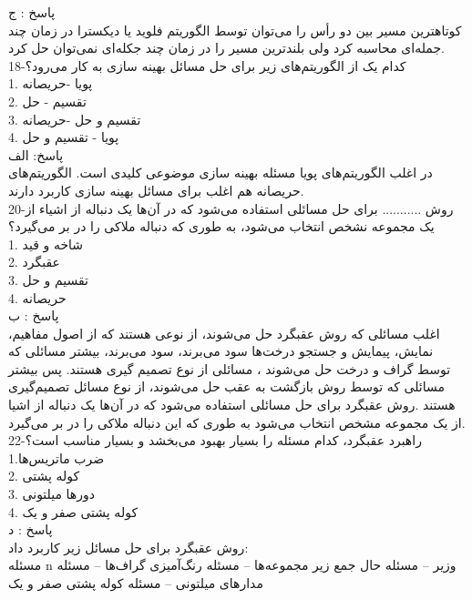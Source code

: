 \documentclass[10pt,a4paper]{article}
\begin{document}
پاسخ : ج\\
کوتاهترین مسیر بین دو رأس را می‌توان توسط الگوریتم فلوید یا دیکسترا در زمان چند جمله‌ای محاسبه کرد ولی بلندترین مسیر را در زمان چند جکله‌ای نمی‌توان حل کرد.\\

18-کدام یک از الگوریتم‌های زیر برای حل مسائل بهینه سازی به کار می‌رود؟\\
1. پویا -حریصانه\\
2. تقسیم - حل\\
3. تقسیم و حل -حریصانه\\
4. پویا - تقسیم و حل\\

پاسخ: الف\\
در اغلب الگوریتم‌های پویا مسئله بهینه سازی موضوعی کلیدی است. الگوریتم‌های حریصانه هم اغلب برای مسائل بهینه سازی کاربرد دارند.\\

20-روش ........... برای حل مسائلی استفاده می‌شود که در آن‌ها یک دنباله از اشیاء از یک مجموعه نشخص انتخاب می‌شود، به طوری که دنباله ملاکی را در بر می‌گیرد؟\\
1. شاخه و قید\\
2. عقبگرد \\
3. تقسیم و حل\\
4. حریصانه\\

پاسخ : ب\\
اغلب مسائلی که روش عقبگرد حل می‌شوند، از نوعی هستند که از اصول مفاهیم، نمایش، پیمایش و جستجو درخت‌ها سود می‌برند، سود می‌برند، بیشتر مسائلی که توسط گراف و درخت حل می‌شوند ، مسائلی از نوع تصمیم گیری هستند. پس بیشتر مسائلی که توسط روش بازگشت به عقب حل می‌شوند، از نوع مسائل تصمیم‌گیری هستند .روش عقبگرد برای حل مسائلی استفاده می‌شود که در آن‌ها یک دنباله از اشیا از یک مجموعه مشخص انتخاب می‌شود به طوری که این دنباله ملاکی را در بر می‌گیرد.\\

22-راهبرد عقبگرد، کدام مسئله را بسیار بهبود می‌بخشد و بسیار مناسب است؟\\
1.ضرب ماتریس‌ها\\
2. کوله پشتی\\
3. دورها میلتونی\\
4. کوله پشتی صفر و یک\\

پاسخ : د\\
روش عقبگرد برای حل مسائل زیر کاربرد داد:\\
مسئله n وزیر -- مسئله حال جمع زیر مجموعه‌ها -- مسئله رنگ‌آمیزی گراف‌ها -- مسئله مدارهای میلتونی -- مسئله کوله پشتی صفر و یک\\
\end{document}
